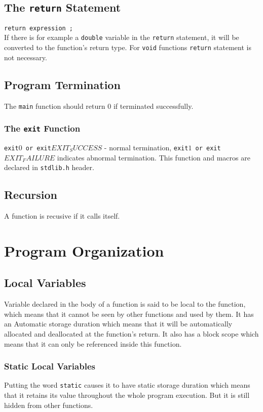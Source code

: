 \documentclass[openany]{book}
\begin{document}
    \section{The \texttt{return} Statement}
    \texttt{return expression ;} \\
    If there is for example a \texttt{double} variable in the \texttt{return} statement, it will be
    converted to the function's return type. For \texttt{void} functions \texttt{return} statement
    is not necessary.

    \section{Program Termination}
    The \texttt{main} function should return 0 if terminated successfully.

    \subsection*{The \texttt{exit} Function}
    \texttt{exit\(0\) or exit\(EXIT_SUCCESS\)} - normal termination, \texttt{exit\(1\) or exit\(EXIT_FAILURE\)}
    indicates abnormal termination. This function and macros are declared in \texttt{stdlib.h} header.

    \section{Recursion}
    A function is recusive if it calls itself.

    \chapter{Program Organization}

    \section{Local Variables}
    Variable declared in the body of a function is said to be local to the function, which means that
    it cannot be seen by other functions and used by them. It has an Automatic storage duration which
    means that it will be automatically allocated and deallocated at the function's return. It also
    has a block scope which means that it can only be referenced inside this function.

    \subsection*{Static Local Variables}
    Putting the word \texttt{static} causes it to have static storage duration which means that it
    retains its value throughout the whole program execution. But it is still hidden from other
    functions.
\end{document}
